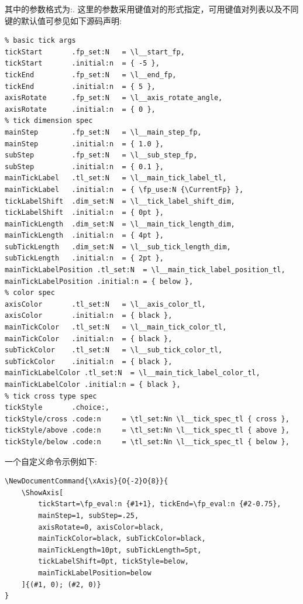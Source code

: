 其中\cmd{\ShowAxis}\index{\cmd{\ShowAxis}}的参数格式为:.
这里的参数采用键值对的形式指定，可用键值对列表以及不同键的默认值可参见如下源码声明:
\begin{verbatim}
% basic tick args
tickStart       .fp_set:N   = \l__start_fp,
tickStart       .initial:n  = { -5 },
tickEnd         .fp_set:N   = \l__end_fp,
tickEnd         .initial:n  = { 5 },
axisRotate      .fp_set:N   = \l__axis_rotate_angle,
axisRotate      .initial:n  = { 0 },
% tick dimension spec
mainStep        .fp_set:N   = \l__main_step_fp,
mainStep        .initial:n  = { 1.0 },
subStep         .fp_set:N   = \l__sub_step_fp,
subStep         .initial:n  = { 0.1 },
mainTickLabel   .tl_set:N   = \l__main_tick_label_tl,
mainTickLabel   .initial:n  = { \fp_use:N {\CurrentFp} },
tickLabelShift  .dim_set:N  = \l__tick_label_shift_dim,
tickLabelShift  .initial:n  = { 0pt },
mainTickLength  .dim_set:N  = \l__main_tick_length_dim,
mainTickLength  .initial:n  = { 4pt },
subTickLength   .dim_set:N  = \l__sub_tick_length_dim,
subTickLength   .initial:n  = { 2pt },
mainTickLabelPosition .tl_set:N  = \l__main_tick_label_position_tl,
mainTickLabelPosition .initial:n = { below },
% color spec
axisColor       .tl_set:N   = \l__axis_color_tl,
axisColor       .initial:n  = { black },
mainTickColor   .tl_set:N   = \l__main_tick_color_tl,
mainTickColor   .initial:n  = { black },
subTickColor    .tl_set:N   = \l__sub_tick_color_tl,
subTickColor    .initial:n  = { black },
mainTickLabelColor .tl_set:N  = \l__main_tick_label_color_tl,
mainTickLabelColor .initial:n = { black },
% tick cross type spec
tickStyle       .choice:,
tickStyle/cross .code:n     = \tl_set:Nn \l__tick_spec_tl { cross },
tickStyle/above .code:n     = \tl_set:Nn \l__tick_spec_tl { above },
tickStyle/below .code:n     = \tl_set:Nn \l__tick_spec_tl { below },
\end{verbatim}

一个自定义\cmd{\ShowAxis}命令示例如下:
\begin{verbatim}
\NewDocumentCommand{\xAxis}{O{-2}O{8}}{
    \ShowAxis[
        tickStart=\fp_eval:n {#1+1}, tickEnd=\fp_eval:n {#2-0.75}, 
        mainStep=1, subStep=.25, 
        axisRotate=0, axisColor=black,
        mainTickColor=black, subTickColor=black,
        mainTickLength=10pt, subTickLength=5pt,
        tickLabelShift=0pt, tickStyle=below, 
        mainTickLabelPosition=below
    ]{(#1, 0); (#2, 0)}
}
\end{verbatim}

